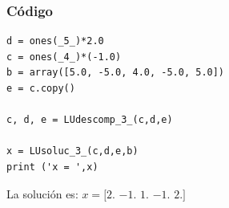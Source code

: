 \begin{frame}
\frametitle{Código}
\begin{lstlisting}[caption=Código completo para la solución tridiagonal, style=FormattedNumber, basicstyle=\linespread{1.1}\ttfamily=\small, columns=fullflexible]
d = ones(_5_)*2.0
c = ones(_4_)*(-1.0)
b = array([5.0, -5.0, 4.0, -5.0, 5.0])
e = c.copy()

c, d, e = LUdescomp_3_(c,d,e)

x = LUsoluc_3_(c,d,e,b)
print ('x = ',x)
\end{lstlisting}
\pause
La solución es: $x = [ 2. $ $-1.$ $1.$ $-1.$ $2.]$
\end{frame}
